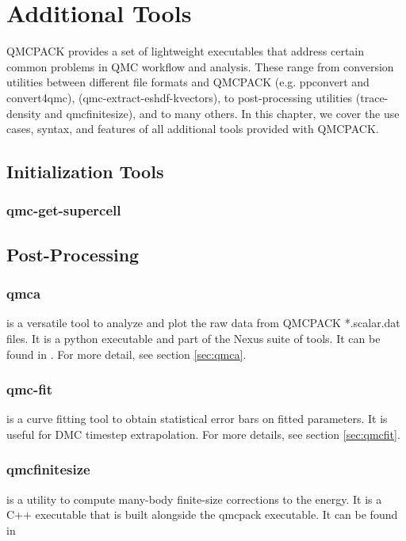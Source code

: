 \chapter{Additional Tools}
\label{chap:additional_tools}
QMCPACK provides a set of lightweight executables that address certain
common problems in QMC workflow and analysis.  These range from conversion utilities between 
different file formats and QMCPACK (e.g. ppconvert and convert4qmc),  
(qmc-extract-eshdf-kvectors), to post-processing utilities (trace-density and qmcfinitesize), and to many others.  In this chapter, we cover the use cases, syntax, and features of all additional tools provided with QMCPACK.  

\section{Initialization Tools}
  \subsection{qmc-get-supercell}

\section{Post-Processing}
  \subsection{qmca}
     is a versatile tool to analyze and plot the raw data from QMCPACK *.scalar.dat files.
    It is a python executable and part of the Nexus suite of tools.  It can be found in 
    . For more detail, see section \ref{sec:qmca}.
  \subsection{qmc-fit}
     is a curve fitting tool to obtain statistical error bars on fitted parameters.
    It is useful for DMC timestep extrapolation.  For more details, see section \ref{sec:qmcfit}.
  \subsection{qmcfinitesize}
     is a utility to compute many-body finite-size corrections to the energy.  It
    is a C++ executable that is built alongside the qmcpack executable.  It can be found in 

